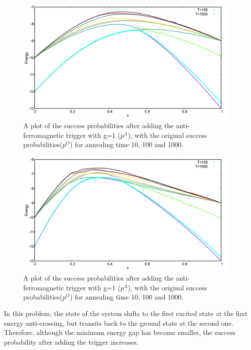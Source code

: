 \documentclass[12]{article}
\begin{document}
\begin{figure}[H]
\centering 
\includegraphics[scale=0.3]{441_O_T100_1000.png}
\caption{A plot of the success probabilities after adding the anti-ferromagnetic trigger with g=1 ($p^A$), with the original success probabilities($p^O$) for annealing time 10, 100 and 1000.}
\label{fig:a28}
\end{figure}
\begin{figure}[H]
\centering 
\includegraphics[scale=0.3]{441_A_g1_T100_1000.png}
\caption{A plot of the success probabilities after adding the anti-ferromagnetic trigger with g=1 ($p^A$), with the original success probabilities($p^O$) for annealing time 10, 100 and 1000.}
\label{fig:a29}
\end{figure}

In this problem, the state of the system shifts to the first excited state at the first energy anti-crossing, but transits back to the ground state at the second one. Therefore, although the minimum energy gap has become smaller, the success probability after adding the trigger increases.\\
\end{document}
